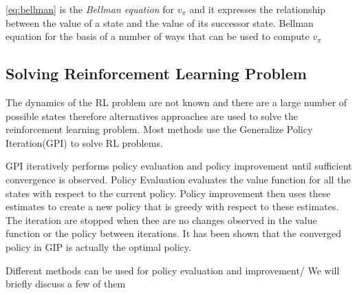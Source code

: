 \ref{eq:bellman} is the \emph{Bellman equation} for $v_\pi$ and it expresses the relationship between the value of a state and the value of its successor state. Bellman equation for the basis of a number of ways that can be used to compute $v_\pi$

\subsection{Solving Reinforcement Learning Problem}

The dynamics of the RL problem are not known and there are a large number of possible states therefore alternatives approaches are used to solve the reinforcement learning problem. Most methods use the Generalize Policy Iteration(GPI) to solve RL problems. 

GPI iteratively performs policy evaluation and policy improvement until sufficient convergence is observed. Policy Evaluation evaluates the value function for all the states with respect to the current policy. Policy improvement then uses these estimates to create a new policy that is greedy with respect to these estimates. The iteration are stopped when thee are no changes observed in the value function or the policy between iterations. It has been shown that the converged policy in GIP is actually the optimal policy. 

Different methods can be used for policy evaluation and improvement/ We will briefly discuss a few of them 

